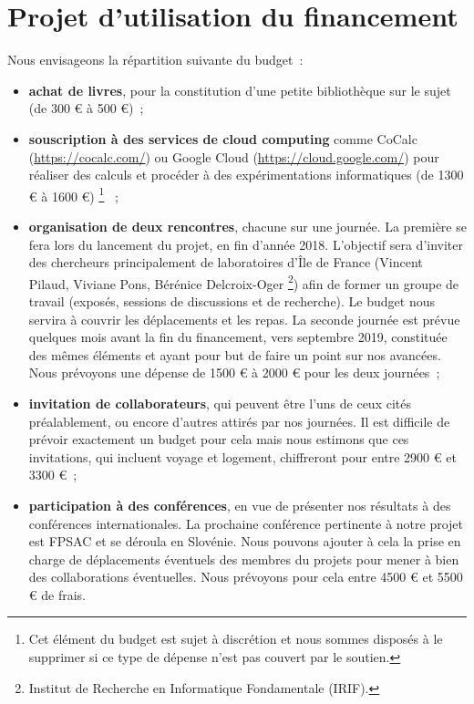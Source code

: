 \documentclass[a4paper, 10pt]{article}
\numberwithin{equation}{subsection}
\begin{document}
\vspace{-1cm}

\section*{\center Projet d'utilisation du financement}
Nous envisageons la répartition suivante du budget~:
\begin{itemize}
    \item {\bf achat de livres}, pour la constitution d'une petite
    bibliothèque sur le sujet (de 300 € à 500 €)~;

    \item {\bf souscription à des services de cloud computing} comme
    {\sc CoCalc} (\url{https://cocalc.com/}) ou {\sc Google Cloud}
    (\url{https://cloud.google.com/}) pour réaliser des calculs
    et procéder à des expérimentations informatiques (de 1300 € à 1600 €)%
    \footnote{Cet élément du budget est sujet à discrétion et nous
    sommes disposés à le supprimer si ce type de dépense n'est pas
    couvert par le soutien.}%
    ~;

    \item {\bf organisation de deux rencontres}, chacune sur une
    journée. La
    première se fera lors du lancement du projet, en fin d'année 2018.
    L'objectif sera d'inviter des chercheurs principalement de
    laboratoires d'Île de France (Vincent Pilaud, Viviane Pons,
    Bérénice Delcroix-Oger%
    \footnote{Institut de Recherche en Informatique Fondamentale
    (IRIF).})
    afin de former un groupe de travail
    (exposés, sessions de discussions et de recherche). Le budget
    nous servira à couvrir les déplacements et les repas. La
    seconde journée est prévue quelques mois avant la fin du
    financement, vers septembre 2019, constituée des mêmes éléments et
    ayant pour but de faire un point sur nos avancées. Nous
    prévoyons une dépense de 1500 € à 2000 € pour les deux journées~;

    \item {\bf invitation de collaborateurs}, qui peuvent être l'uns de
    ceux cités préalablement, ou encore d'autres attirés par nos
    journées. Il est difficile de prévoir exactement un budget pour cela
    mais nous estimons que ces invitations, qui incluent voyage et
    logement, chiffreront pour entre 2900 € et 3300 €~;

    \item {\bf participation à des conférences}, en vue de présenter
    nos résultats à des conférences internationales. La prochaine
    conférence pertinente à notre projet est FPSAC
     et se déroula en Slovénie.
    Nous pouvons ajouter à cela la prise en charge de déplacements
    éventuels des membres du projets pour mener à bien des collaborations
    éventuelles.
    Nous prévoyons pour cela entre 4500 € et 5500 € de frais.
\end{itemize}
\smallbreak
\end{document}
